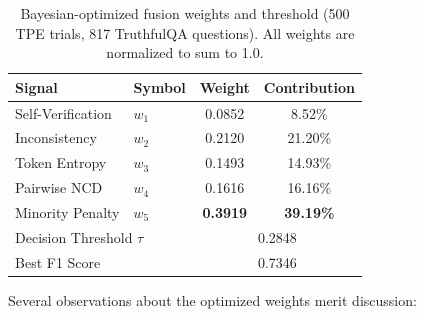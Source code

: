 \begin{table}[!htbp]
    \centering
    \caption{Bayesian-optimized fusion weights and threshold (500 TPE trials, 817 TruthfulQA questions). All weights are normalized to sum to 1.0.}
    \label{tab:optimized_weights}
    \begin{tabular}{llcc}
        \toprule
        Signal & Symbol & Weight & Contribution \\
        \midrule
        Self-Verification   & $w_1$ & 0.0852 & 8.52\% \\
        Inconsistency       & $w_2$ & 0.2120 & 21.20\% \\
        Token Entropy        & $w_3$ & 0.1493 & 14.93\% \\
        Pairwise NCD         & $w_4$ & 0.1616 & 16.16\% \\
        Minority Penalty     & $w_5$ & \textbf{0.3919} & \textbf{39.19\%} \\
        \midrule
        \multicolumn{2}{l}{Decision Threshold $\tau$} & \multicolumn{2}{c}{0.2848} \\
        \midrule
        \multicolumn{2}{l}{Best F1 Score} & \multicolumn{2}{c}{0.7346} \\
        \bottomrule
    \end{tabular}
\end{table}

Several observations about the optimized weights merit discussion:

